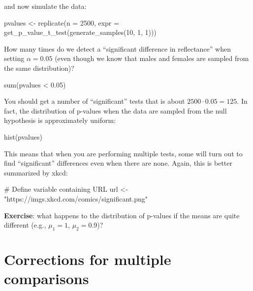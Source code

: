\documentclass[
  letterpaper,
  DIV=11,
  numbers=noendperiod]{scrreprt}
\newenvironment{Shaded}{\begin{snugshade}}{\end{snugshade}}
\newcommand{\NormalTok}[1]{\textcolor[rgb]{0.00,0.23,0.31}{#1}}
\begin{document}
and now simulate the data:

\begin{Shaded}
\begin{Highlighting}[]
\NormalTok{pvalues \textless{}{-} replicate(n = 2500, }
\NormalTok{                     expr = get\_p\_value\_t\_test(generate\_samples(10, 1, 1)))}
\end{Highlighting}
\end{Shaded}

How many times do we detect a ``significant difference in reflectance''
when setting \(\alpha = 0.05\) (even though we know that males and
females are sampled from the same distribution)?

\begin{Shaded}
\begin{Highlighting}[]
\NormalTok{sum(pvalues \textless{} 0.05)}
\end{Highlighting}
\end{Shaded}

You should get a number of ``significant'' tests that is about
\(2500 \cdot 0.05 = 125\). In fact, the distribution of p-values when
the data are sampled from the null hypothesis is approximately uniform:

\begin{Shaded}
\begin{Highlighting}[]
\NormalTok{hist(pvalues)}
\end{Highlighting}
\end{Shaded}

This means that when you are performing multiple tests, some will turn
out to find ``significant'' differences even when there are none. Again,
this is better summarized by xkcd:

\begin{Shaded}
\begin{Highlighting}[]
\NormalTok{\# Define variable containing URL}
\NormalTok{url \textless{}{-} "https://imgs.xkcd.com/comics/significant.png"}
\end{Highlighting}
\end{Shaded}

\textbf{Exercise}: what happens to the distribution of p-values if the
means are quite different (e.g., \(\mu_1 = 1\), \(\mu_2 = 0.9\))?

\section{Corrections for multiple
comparisons}\label{corrections-for-multiple-comparisons}
\end{document}
